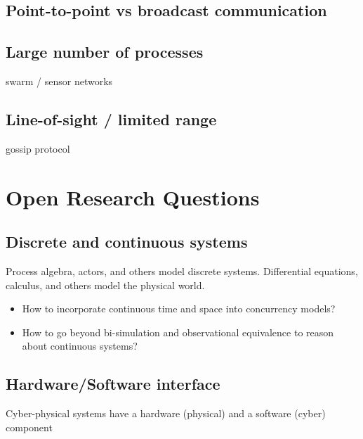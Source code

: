 \documentclass[
graybox,
envcountchap
]{svmult}
\begin{document}
\begin{bibunit}

    \subsection{Point-to-point vs broadcast communication}

    \subsection{Large number of processes}

    swarm / sensor networks

    \subsection{Line-of-sight / limited range}

    gossip protocol

\section{Open Research Questions} %

    \subsection{Discrete and continuous systems}

    Process algebra, actors, and others model discrete systems.
    Differential equations, calculus, and others model the physical world.

    \begin{itemize}
    \item How to incorporate continuous time and space into concurrency models?
    \item How to go beyond bi-simulation and observational equivalence to reason about continuous systems?
    \end{itemize}
    
    \subsection{Hardware/Software interface}

    Cyber-physical systems have a hardware (physical) and a software (cyber) component
    

\end{bibunit}
\end{document}
